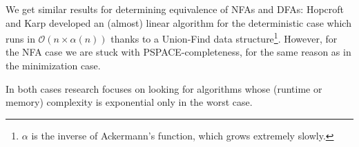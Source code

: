 We get similar results for determining equivalence of NFAs and DFAs:
Hopcroft and Karp developed an (almost) linear algorithm for the deterministic
case which runs in $\mathcal{O}(n \times \alpha(n))$ thanks to a
Union-Find data structure\footnote{$\alpha$ is the inverse of Ackermann's
function, which grows extremely slowly.}.
However, for the NFA case we are stuck with PSPACE-completeness, for the same
reason as in the minimization case.

In both cases research focuses on looking for algorithms whose
(runtime or memory) complexity is exponential only in the worst case.
